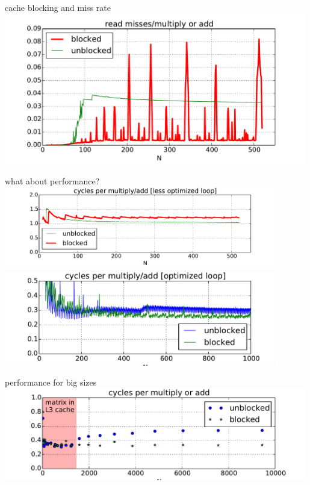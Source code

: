
\begin{frame}{cache blocking and miss rate}
\includegraphics[width=0.99\textwidth]{../caching/k-block-novec-read_miss_rate}
\end{frame}

\begin{frame}{what about performance?}
\includegraphics[width=0.9\textwidth]{../caching/k-block-novec-cyclespercount} \\
\includegraphics[width=0.9\textwidth]{../caching/k-blockC-vec-cyclespercount}
\end{frame}

\begin{frame}{performance for big sizes}
\includegraphics[width=0.99\textwidth]{../caching/k-vec-big-block-cpelement}
\end{frame}
